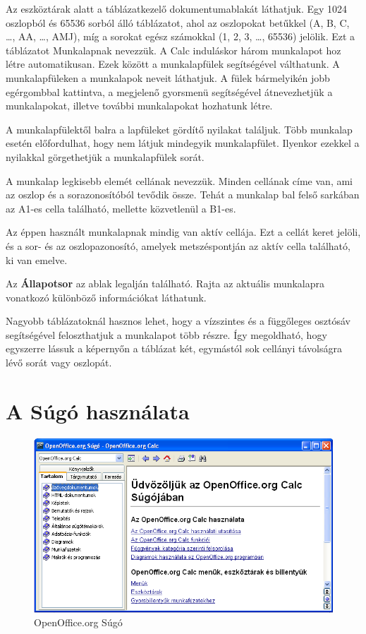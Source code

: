 Az eszköztárak alatt a táblázatkezelő dokumentumablakát
láthatjuk. Egy 1024 oszlopból és 65536 sorból álló
táblázatot, ahol az oszlopokat betűkkel (A, B, C, {\dots}, AA,
{\dots}, AMJ), míg a sorokat egész számokkal (1, 2, 3, {\dots},
65536) jelölik. Ezt a táblázatot Munkalapnak nevezzük. A Calc
induláskor három munkalapot hoz létre automatikusan. Ezek
között a munkalapfülek segítségével válthatunk. A
munkalapfüleken a munkalapok neveit láthatjuk. A fülek
bármelyikén jobb egérgombbal kattintva, a megjelenő
gyorsmenü segítségével átnevezhetjük a munkalapokat,
illetve további munkalapokat hozhatunk létre.

A munkalapfülektől balra a lapfüleket gördítő nyilakat
találjuk. Több munkalap esetén előfordulhat, hogy nem
látjuk mindegyik munkalapfület. Ilyenkor ezekkel a nyilakkal
görgethetjük a munkalapfülek sorát.

A munkalap legkisebb elemét cellának nevezzük. Minden cellának
címe van, ami az oszlop és a sorazonosítóból tevődik
össze. Tehát a munkalap bal felső sarkában az A1-es cella
található, mellette közvetlenül a B1-es.

Az éppen használt munkalapnak mindig van aktív cellája. Ezt a
cellát keret jelöli, és a sor- és az oszlopazonosító,
amelyek metszéspontján az aktív cella található, ki van
emelve.

Az \textbf{Állapotsor} az ablak legalján található. Rajta az
aktuális munkalapra vonatkozó különböző információkat
láthatunk.

Nagyobb táblázatoknál hasznos lehet, hogy a vízszintes és a
függőleges osztósáv segítségével feloszthatjuk a
munkalapot több részre. Így megoldható, hogy egyszerre lássuk
a képernyőn a táblázat két, egymástól sok cellányi
távolságra lévő sorát vagy oszlopát.  


\section{A Súgó használata}

\begin{figure}[!h]
\begin{center}
\includegraphics[width=15.999cm]{oocalcv1-img3.png}
\caption{OpenOffice.org Súgó}\label{Súgó}
\end{center}
\end{figure}

